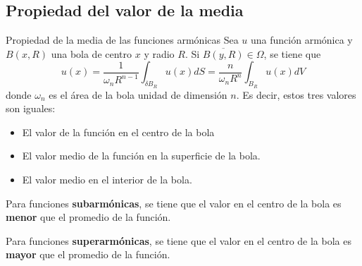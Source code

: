 \subsection{Propiedad del valor de la media}
\begin{mathresult}{Propiedad de la media de las funciones armónicas}
Sea $u$ una función armónica y $B(x,R)$ una bola de centro $x$ y radio $R$. Si $\overline{B(y,R)}\in \Omega$, se tiene que 
$$u(x) = \frac{1}{\omega_nR^{n-1}}\int_{\delta B_R} u(x)dS = \frac{n}{\omega_n R^n} \int_{B_R}u(x)dV$$
donde $\omega_n$ es el área de la bola unidad de dimensión $n$. Es decir, estos tres valores son iguales:
\begin{itemize}
\item El valor de la función en el centro de la bola
\item El valor medio de la función en la superficie de la bola.
\item El valor medio en el interior de la bola.
\end{itemize}

Para funciones \textbf{subarmónicas}, se tiene que el valor en el centro de la bola es \textbf{menor} que el promedio de la función.

Para funciones \textbf{superarmónicas}, se tiene que el valor en el centro de la bola es \textbf{mayor} que el promedio de la función.
\end{mathresult}

